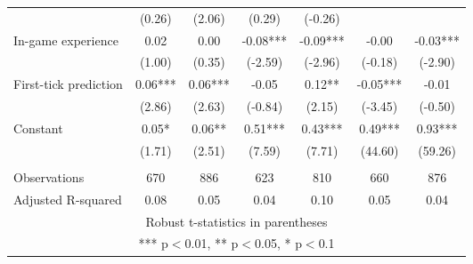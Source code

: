 \documentclass[]{article}
\begin{document}
\begin{tabular}{lcccccc}
 & (0.26) & (2.06) & (0.29) & (-0.26) &  &  \\
In-game experience & 0.02 & 0.00 & -0.08*** & -0.09*** & -0.00 & -0.03*** \\
 & (1.00) & (0.35) & (-2.59) & (-2.96) & (-0.18) & (-2.90) \\
First-tick prediction & 0.06*** & 0.06*** & -0.05 & 0.12** & -0.05*** & -0.01 \\
 & (2.86) & (2.63) & (-0.84) & (2.15) & (-3.45) & (-0.50) \\
Constant & 0.05* & 0.06** & 0.51*** & 0.43*** & 0.49*** & 0.93*** \\
 & (1.71) & (2.51) & (7.59) & (7.71) & (44.60) & (59.26) \\
 &  &  &  &  &  &  \\
Observations & 670 & 886 & 623 & 810 & 660 & 876 \\
 Adjusted R-squared & 0.08 & 0.05 & 0.04 & 0.10 & 0.05 & 0.04 \\ \hline
\multicolumn{7}{c}{ Robust t-statistics in parentheses} \\
\multicolumn{7}{c}{ *** p$<$0.01, ** p$<$0.05, * p$<$0.1} \\
\end{tabular}
\end{document}
